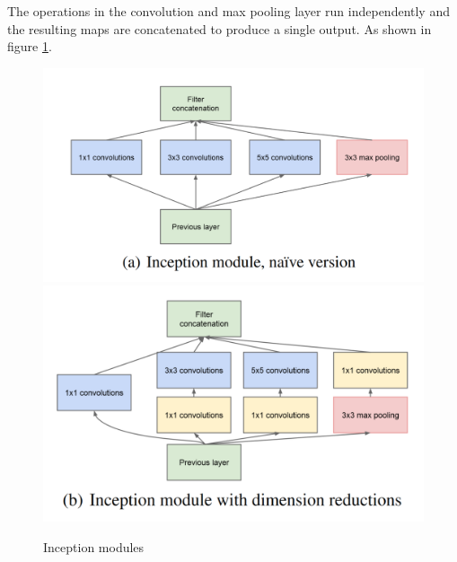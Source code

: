 \documentclass[10pt,twocolumn,letterpaper]{article}
\begin{document}
The operations in the convolution and max pooling layer run independently and the resulting maps are concatenated to produce a single output. As shown in figure \ref{fig:inc}. \cite{szegedy_going_2014}
\begin{figure}[h]
\centering
\label{fig:inc}
\includegraphics[scale = 0.23]{naive_inc.png}
\includegraphics[scale = 0.25]{inception_module.png}
\caption{Inception modules}
\end{figure}
\end{document}
